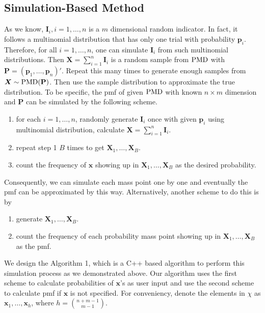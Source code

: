 \documentclass[12pt]{article}
\newcommand{\Ivec}{{\boldsymbol{I}}}
\newcommand{\Pmat}{\mathbf{P}}
\newcommand{\pvec}{\boldsymbol{p}}
\newcommand{\PMD}{{\normalfont\textrm{PMD}}}
\newcommand{\Xvec}{\boldsymbol{X}}
\newcommand{\xvec}{\boldsymbol{x}}
\begin{document}
\subsection{Simulation-Based Method}
As we know, $\Ivec_i, i=1,\dots,n$ is a $m$ dimensional random indicator. In fact, it follows a multinomial distribution that has only one trial with probability $\pvec_i$. Therefore, for all $i=1,\dots, n$, one can simulate $\Ivec_i$ from such multinomial distributions. Then $\Xvec = \sum_{i=1}^{n}\Ivec_i$ is a random sample from $\PMD$ with $\Pmat = (\pvec_1, \dots,\pvec_n)'$. Repeat this many times to generate enough samples from $\Xvec \sim \PMD(\Pmat)$. Then use the sample distribution to approximate the true distribution. To be specific, the pmf of given $\PMD$ with known $n \times m$ dimension and $\Pmat$ can be simulated by the following scheme.

\begin{enumerate}[Step 1]
    \item for each $i=1,\dots,n$,  randomly generate $\Ivec_i$ once with given $\pvec_i$ using multinomial distribution, calculate $\Xvec = \sum_{i=1}^{n}\Ivec_i$.
    \item repeat step 1 $B$ times to get $\Xvec_{1},\dots,\Xvec_{B}.$
    \item count the frequency of $\xvec$ showing up in $\Xvec_{1},\dots,\Xvec_{B}$ as the desired probability.
\end{enumerate}
Consequently, we can simulate each mass point one by one and eventually the pmf can be approximated by this way. Alternatively, another scheme to do this is by
\begin{enumerate}[Step 1]
	\item generate $\Xvec_{1},\dots,\Xvec_{B}$.
	\item count the frequency of each probability mass point showing up in $\Xvec_{1},\dots,\Xvec_{B}$ as the pmf.
\end{enumerate}
 We design the Algorithm 1, which is a C++ based algorithm to perform this simulation process as we demonstrated above. Our algorithm uses the first scheme to calculate probabilities of $\xvec$'s as user input  and use the second scheme to calculate pmf if $\xvec$ is not specified. For conveniency, denote the elements in $\chi$ as $\xvec_1, \dots, \xvec_h$, where $h=\binom{n+m-1}{m-1}$.
\end{document}
